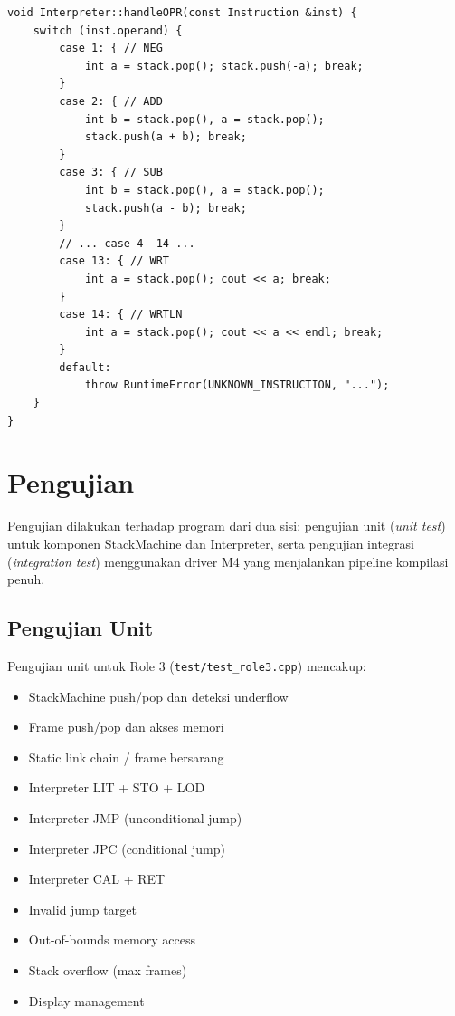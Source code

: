 \documentclass[12pt,a4paper]{article}
\begin{document}
\begin{lstlisting}[style=cpp, caption={Implementasi OPR operations}]
void Interpreter::handleOPR(const Instruction &inst) {
    switch (inst.operand) {
        case 1: { // NEG
            int a = stack.pop(); stack.push(-a); break;
        }
        case 2: { // ADD
            int b = stack.pop(), a = stack.pop();
            stack.push(a + b); break;
        }
        case 3: { // SUB
            int b = stack.pop(), a = stack.pop();
            stack.push(a - b); break;
        }
        // ... case 4--14 ...
        case 13: { // WRT
            int a = stack.pop(); cout << a; break;
        }
        case 14: { // WRTLN
            int a = stack.pop(); cout << a << endl; break;
        }
        default:
            throw RuntimeError(UNKNOWN_INSTRUCTION, "...");
    }
}
\end{lstlisting}


\section{Pengujian}

Pengujian dilakukan terhadap program dari dua sisi: pengujian unit
(\textit{unit test}) untuk komponen StackMachine dan Interpreter, serta
pengujian integrasi (\textit{integration test}) menggunakan driver M4 yang
menjalankan pipeline kompilasi penuh.

\subsection{Pengujian Unit}

Pengujian unit untuk Role 3 (\texttt{test/test\_role3.cpp}) mencakup:

\begin{itemize}
    \item StackMachine push/pop dan deteksi underflow
    \item Frame push/pop dan akses memori
    \item Static link chain / frame bersarang
    \item Interpreter LIT + STO + LOD
    \item Interpreter JMP (unconditional jump)
    \item Interpreter JPC (conditional jump)
    \item Interpreter CAL + RET
    \item Invalid jump target
    \item Out-of-bounds memory access
    \item Stack overflow (max frames)
    \item Display management
\end{itemize}
\end{document}
